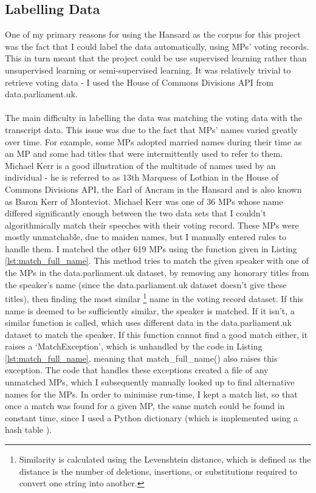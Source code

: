 \documentclass[12pt,a4paper,twoside,openright]{report}
\newcommand{\mylisting}[4]{}
\newcommand{\pylisting}[2]{\mylisting{Python}{py}{#1}{#2}}
\begin{document}
\pylisting{Python code using regular expressions to clean the text from a paragraph tag.}{get_paragraph_text}
\subsection{Labelling Data} \label{impl-labelling}

One of my primary reasons for using the Hansard as the corpus for this project was the fact that I could label the data automatically, using MPs' voting records. This in turn meant that the project could be use supervised learning rather than unsupervised learning or semi-supervised learning. It was relatively trivial to retrieve voting data - I used the House of Commons Divisions API from data.parliament.uk.
\\\\
The main difficulty in labelling the data was matching the voting data with the transcript data. This issue was due to the fact that MPs' names varied greatly over time. For example, some MPs adopted married names during their time as an MP and some had titles that were intermittently used to refer to them. Michael Kerr is a good illustration of the multitude of names used by an individual - he is referred to as 13th Marquess of Lothian in the House of Commons Divisions API, the Earl of Ancram in the Hansard and is also known as Baron Kerr of Monteviot. Michael Kerr was one of 36 MPs whose name differed significantly enough between the two data sets that I couldn't algorithmically match their speeches with their voting record. These MPs were mostly unmatchable, due to maiden names, but I manually entered rules to handle them. I matched the other 619 MPs using the function given in Listing \ref{lst:match_full_name}. This method tries to match the given speaker with one of the MPs in the data.parliament.uk dataset, by removing any honorary titles from the speaker's name (since the data.parliament.uk dataset doesn't give these titles), then finding the most similar \footnote{Similarity is calculated using the Levenshtein distance, which is defined as the distance is the number of deletions, insertions, or substitutions required to convert one string into another.} name in the voting record dataset. If this name is deemed to be sufficiently similar, the speaker is matched. If it isn't, a similar function is called, which uses different data in the data.parliament.uk dataset to match the speaker. If this function cannot find a good match either, it raises a `MatchException', which is unhandled by the code in Listing \ref{lst:match_full_name}, meaning that match\_full\_name() also raises this exception. The code that handles these exceptions created a file of any unmatched MPs, which I subsequently manually looked up to find alternative names for the MPs. In order to minimise run-time, I kept a match list, so that once a match was found for a given MP, the same match could be found in constant time, since I used a Python dictionary (which is implemented using a hash table \cite{pythonfaqs}).
\end{document}
